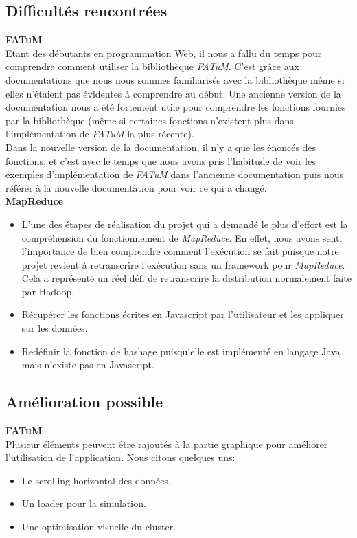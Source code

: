 \subsection{Difficultés rencontrées}
{\bf FATuM}\\

Etant des débutants en programmation Web, il nous a fallu du temps pour comprendre comment utiliser la bibliothèque {\it FATuM}. C'est grâce aux documentations que nous nous sommes familiarisés avec la bibliothèque même si elles n'étaient pas évidentes à comprendre au début. Une ancienne version de la documentation nous a été fortement utile pour comprendre les fonctions fournies par la bibliothèque (même si certaines fonctions n'existent plus dans l'implémentation de {\it FATuM} la plus récente).\\ 

Dans la nouvelle version de la documentation, il n'y a que les énoncés des fonctions, et c'est avec le temps que nous avons pris l'habitude de voir les exemples d'implémentation de {\it FATuM} dans l'ancienne documentation puis nous référer à la nouvelle documentation pour voir ce qui a changé.\\

{\bf MapReduce}\\
\begin{itemize}
\item L'une des étapes de réalisation du projet qui a demandé le plus d'effort est la compréhension du fonctionnement de {\it MapReduce}. En effet, nous avons senti l'importance de bien comprendre comment l'exécution se fait puisque notre projet revient à retranscrire l'exécution sans un framework pour {\it MapReduce}.\\
Cela a représenté un réel défi de retranscrire la distribution normalement faite par Hadoop.\\

\item Récupérer les fonctions écrites en Javascript par l'utilisateur et les appliquer sur les données.\\

\item Redéfinir la fonction de hashage puisqu'elle est implémenté en langage Java mais n'existe pas en Javascript. 
\end{itemize}

\subsection{Amélioration possible}
{\bf FATuM}\\
Plusieur éléments peuvent être rajoutés à la partie graphique pour améliorer l'utilisation de l'application. Nous citons quelques uns:\\
\begin{itemize}
\item Le scrolling horizontal des données.
\item Un loader pour la simulation.
\item Une optimisation visuelle du cluster.
\end{itemize}

